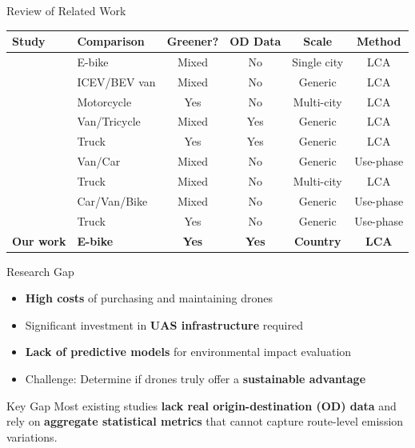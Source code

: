 \documentclass[9pt]{beamer}
\begin{document}
\begin{frame}{Review of Related Work}

  \footnotesize
  \centering
  \begin{tabular}{l l c c c c}
    \toprule
    \textbf{Study} & \textbf{Comparison} & \textbf{Greener?} & \textbf{OD Data} & \textbf{Scale} & \textbf{Method} \\
    \midrule
    \textcite{li_beyond_2025} & E-bike & Mixed & No & Single city & LCA \\
    \textcite{yowtak_comparative_2020} & ICEV/BEV van & Mixed & No & Generic & LCA \\
    \textcite{park_comparative_2018} & Motorcycle & Yes & No & Multi-city & LCA \\
    \textcite{figliozzi_lifecycle_2017} & Van/Tricycle & Mixed & Yes & Generic & LCA \\
    \textcite{baldisseri_truck-based_2022} & Truck & Yes & Yes & Generic & LCA \\
    \textcite{figliozzi_carbon_2020} & Van/Car & Mixed & No & Generic & Use-phase \\
    \textcite{stolaroff_energy_2018} & Truck & Mixed & No & Multi-city & LCA \\
    \textcite{rodrigues_drone_2022} & Car/Van/Bike & Mixed & No & Generic & Use-phase \\
    \textcite{kirschstein_comparison_2020} & Truck & Yes & No & Generic & Use-phase \\
    \midrule
    \textbf{Our work} & \textbf{E-bike} & \textbf{Yes} & \textbf{Yes} & \textbf{Country} & \textbf{LCA} \\
    \bottomrule
  \end{tabular}
\end{frame}

\begin{frame}{Research Gap}
  \begin{itemize}
    \item \textbf{High costs} of purchasing and maintaining drones
    \item Significant investment in \textbf{UAS infrastructure} required
    \item \textbf{Lack of predictive models} for environmental impact evaluation
    \item Challenge: Determine if drones truly offer a \textbf{sustainable advantage}
  \end{itemize}

  \vspace{1em}
  \begin{block}{Key Gap}
    Most existing studies \textbf{lack real origin-destination (OD) data} and rely on \textbf{aggregate statistical metrics} that cannot capture route-level emission variations.
  \end{block}
\end{frame}
\end{document}

